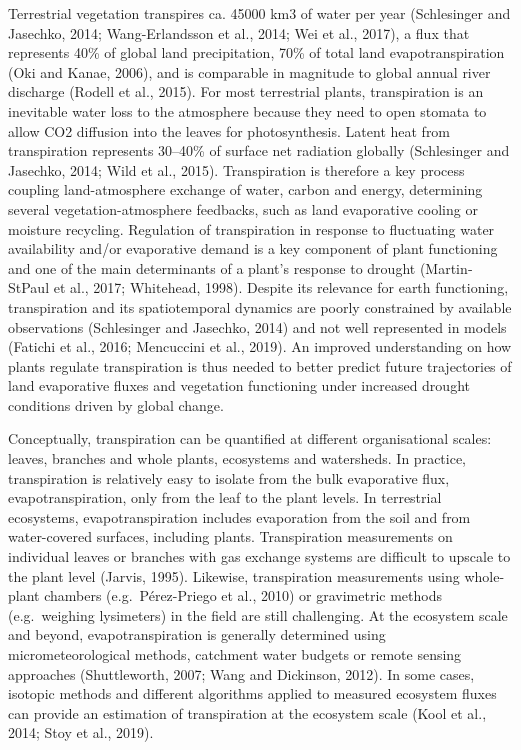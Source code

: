 \documentclass[11pt,twoside]{reedthesis}
\begin{document}
Terrestrial vegetation transpires ca. 45000 km3 of water per year
(Schlesinger and Jasechko, 2014; Wang-Erlandsson et al., 2014; Wei et
al., 2017), a flux that represents 40\% of global land precipitation,
70\% of total land evapotranspiration (Oki and Kanae, 2006), and is
comparable in magnitude to global annual river discharge (Rodell et al.,
2015). For most terrestrial plants, transpiration is an inevitable water
loss to the atmosphere because they need to open stomata to allow CO2
diffusion into the leaves for photosynthesis. Latent heat from
transpiration represents 30--40\% of surface net radiation globally
(Schlesinger and Jasechko, 2014; Wild et al., 2015). Transpiration is
therefore a key process coupling land-atmosphere exchange of water,
carbon and energy, determining several vegetation-atmosphere feedbacks,
such as land evaporative cooling or moisture recycling. Regulation of
transpiration in response to fluctuating water availability and/or
evaporative demand is a key component of plant functioning and one of
the main determinants of a plant's response to drought (Martin‐StPaul et
al., 2017; Whitehead, 1998). Despite its relevance for earth
functioning, transpiration and its spatiotemporal dynamics are poorly
constrained by available observations (Schlesinger and Jasechko, 2014)
and not well represented in models (Fatichi et al., 2016; Mencuccini et
al., 2019). An improved understanding on how plants regulate
transpiration is thus needed to better predict future trajectories of
land evaporative fluxes and vegetation functioning under increased
drought conditions driven by global change.\par

Conceptually, transpiration can be quantified at different
organisational scales: leaves, branches and whole plants, ecosystems and
watersheds. In practice, transpiration is relatively easy to isolate
from the bulk evaporative flux, evapotranspiration, only from the leaf
to the plant levels. In terrestrial ecosystems, evapotranspiration
includes evaporation from the soil and from water-covered surfaces,
including plants. Transpiration measurements on individual leaves or
branches with gas exchange systems are difficult to upscale to the plant
level (Jarvis, 1995). Likewise, transpiration measurements using
whole-plant chambers (e.g.~Pérez-Priego et al., 2010) or gravimetric
methods (e.g.~weighing lysimeters) in the field are still challenging.
At the ecosystem scale and beyond, evapotranspiration is generally
determined using micrometeorological methods, catchment water budgets or
remote sensing approaches (Shuttleworth, 2007; Wang and Dickinson,
2012). In some cases, isotopic methods and different algorithms applied
to measured ecosystem fluxes can provide an estimation of transpiration
at the ecosystem scale (Kool et al., 2014; Stoy et al., 2019).\par
\end{document}
